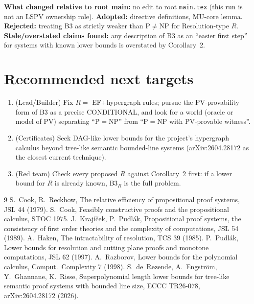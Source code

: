 \documentclass[11pt]{article}
\theoremstyle{definition}
\begin{document}
\textbf{What changed relative to root main:} no edit to root \texttt{main.tex}
(this run is not an LSPV ownership role). \textbf{Adopted:} directive
definitions, MU-core lemma. \textbf{Rejected:} treating B3 as strictly weaker
than P$\ne$NP for Resolution-type $R$. \textbf{Stale/overstated claims found:}
any description of B3 as an ``easier first step'' for systems with known lower
bounds is overstated by Corollary~2.

\section{Recommended next targets}
\begin{enumerate}
\item (Lead/Builder) Fix $R=$ EF$+$hypergraph rules; pursue the PV-provability
  form of B3 as a precise CONDITIONAL, and look for a world (oracle or
  model of PV) separating ``P$=$NP'' from ``P$=$NP with PV-provable witness''.
\item (Certificates) Seek DAG-like lower bounds for the project's hypergraph
  calculus beyond tree-like semantic bounded-line systems (arXiv:2604.28172 as
  the closest current technique).
\item (Red team) Check every proposed $R$ against Corollary~2 first: if a lower
  bound for $R$ is already known, B3$_R$ is the full problem.
\end{enumerate}

\begin{thebibliography}{9}
 S.~Cook, R.~Reckhow, The relative efficiency of propositional proof systems, JSL 44 (1979).
 S.~Cook, Feasibly constructive proofs and the propositional calculus, STOC 1975.
 J.~Krajíček, P.~Pudlák, Propositional proof systems, the consistency of first order theories and the complexity of computations, JSL 54 (1989).
 A.~Haken, The intractability of resolution, TCS 39 (1985).
 P.~Pudlák, Lower bounds for resolution and cutting plane proofs and monotone computations, JSL 62 (1997).
 A.~Razborov, Lower bounds for the polynomial calculus, Comput.\ Complexity 7 (1998).
 S.~de~Rezende, A.~Engström, Y.~Ghannane, K.~Risse, Superpolynomial length lower bounds for tree-like semantic proof systems with bounded line size, ECCC TR26-078, arXiv:2604.28172 (2026).
\end{thebibliography}
\end{document}
